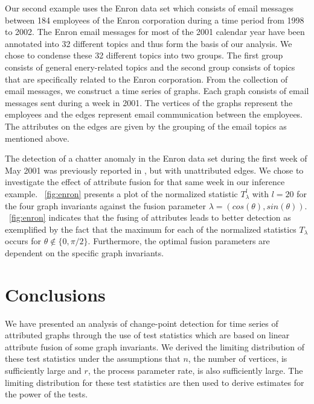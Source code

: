 \documentclass[10pt,journal,compsoc]{IEEEtran}
\theoremstyle{definition}
\begin{document}
Our second example uses the Enron data set which consists of email
messages between 184 employees of the Enron corporation during a time
period from 1998 to 2002. The Enron email messages for most of the
2001 calendar year have been annotated into 32 different topics 
\cite{berry01:_topic_annot_enron_email_data_set} and thus form the
basis of our analysis. We chose to condense these 32 different
topics into two groups. The first group consists of
general enery-related topics and the second group consists of
topics that are specifically related to the Enron corporation. 
From the collection of email messages, we construct a time series of
graphs. Each graph consists of email messages sent during a week in
2001. The vertices of the graphs represent the employees and the edges
represent email communication between the employees. The attributes on
the edges are given by the grouping of the email topics as mentioned
above. 

The detection of a chatter anomaly in the Enron data set during the
first week of May 2001 was previously
reported in \cite{priebe05:_scan_statis_enron_graph}, but with 
unattributed edges. We chose to investigate the effect
of attribute fusion for that same week in our inference example. 
\figurename~\ref{fig:enron} presents a plot of the normalized
statistic $T_{\lambda}^{l}$ with $l = 20$ for the four graph
invariants against the fusion parameter
$\lambda = (cos(\theta), sin(\theta))$. \figurename~\ref{fig:enron}
indicates that the fusing of attributes leads to better detection
as exemplified by the fact that the maximum for each of the normalized
statistics $T_{\lambda}$ occurs for $\theta \not \in
\{0,\pi/2\}$. Furthermore, the optimal fusion parameters are dependent
on the specific graph invariants.
\section{Conclusions}
We have presented an analysis of change-point detection for time
series of attributed graphs through the use of test statistics which
are based on linear attribute fusion of some graph invariants. 
We derived the limiting distribution of these test statistics under
the assumptions that $n$, the number of vertices, is sufficiently
large and $r$, the process parameter rate, is also sufficiently
large. The limiting distribution for these test statistics are then
used to derive estimates for the power of the tests. 
\end{document}
